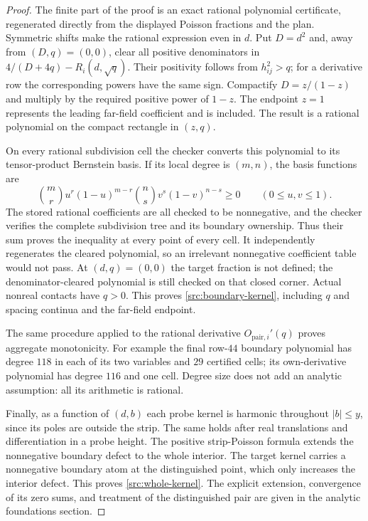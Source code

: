 \documentclass[11pt,a4paper]{article}
\theoremstyle{definition}
\theoremstyle{remark}
\begin{document}
\begin{proof}
The finite part of the proof is an exact rational polynomial
certificate, regenerated directly from the displayed Poisson
fractions and the plan.  Symmetric shifts make the rational expression
even in $d$.  Put $D=d^2$ and, away from $(D,q)=(0,0)$, clear all positive denominators in
$4/(D+4q)-R_i(d,\sqrt q)$.  Their positivity follows from
$h_{ij}^2>q$; for a derivative row the corresponding powers have the
same sign.  Compactify $D=z/(1-z)$ and multiply by the required
positive power of $1-z$.  The endpoint $z=1$ represents the leading
far-field coefficient and is included.  The result is a rational
polynomial on the compact rectangle in $(z,q)$.

On every rational subdivision cell the checker converts this
polynomial to its tensor-product Bernstein basis.  If its local degree
is $(m,n)$, the basis functions are
\[
 \binom{m}{r}u^r(1-u)^{m-r}
 \binom{n}{s}v^s(1-v)^{n-s}\geq0
 \qquad(0\leq u,v\leq1).
\]
The stored rational coefficients are all checked to be nonnegative,
and the checker verifies the complete subdivision tree and its
boundary ownership.  Thus their sum proves the inequality at every
point of every cell.  It independently regenerates the cleared
polynomial, so an irrelevant nonnegative coefficient table would not
pass.  At $(d,q)=(0,0)$ the target fraction is not defined; the
denominator-cleared polynomial is still checked on that closed corner.
Actual nonreal contacts have $q>0$.  This proves
\eqref{src:boundary-kernel}, including $q$ and
spacing continua and the far-field endpoint.

The same procedure applied to the rational derivative $O_{\mathrm{pair},i}'(q)$
proves aggregate monotonicity.  For example the final row-$44$
boundary polynomial has degree $118$ in each of its two variables
and $29$ certified cells; its own-derivative polynomial has degree
$116$ and one cell.  Degree size does not add an analytic assumption:
all its arithmetic is rational.

Finally, as a function of $(d,b)$ each probe kernel is harmonic
throughout $|b|\leq y$, since its poles are outside the strip.
The same holds after real translations and differentiation in a probe
height.  The positive strip-Poisson formula extends the nonnegative
boundary defect to the whole interior.  The target kernel carries a
nonnegative boundary atom at the distinguished point, which only
increases the interior defect.  This proves
\eqref{src:whole-kernel}.  The explicit extension, convergence of its
zero sums, and treatment of the distinguished pair are given in the
analytic foundations section.
\end{proof}
\end{document}
